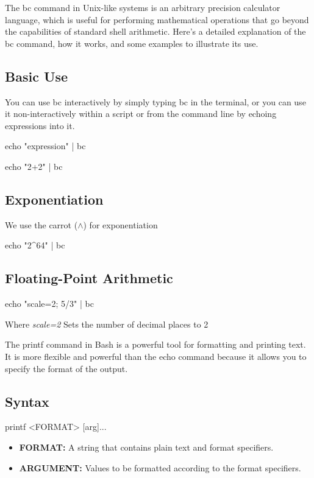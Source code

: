 \documentclass{report}
\begin{document}
    \pagebreak 
    \bigbreak \noindent 
    The bc command in Unix-like systems is an arbitrary precision calculator language, which is useful for performing mathematical operations that go beyond the capabilities of standard shell arithmetic. Here's a detailed explanation of the bc command, how it works, and some examples to illustrate its use.
    \bigbreak \noindent 
    \subsection{Basic Use}
    \bigbreak \noindent 
    You can use bc interactively by simply typing bc in the terminal, or you can use it non-interactively within a script or from the command line by echoing expressions into it.
    \bigbreak \noindent 
    \begin{bashcode}
    echo "expression" | bc

    echo "2+2" | bc
    \end{bashcode}
    \bigbreak \noindent 
    \subsection{Exponentiation}
    \bigbreak \noindent 
    We use the carrot ($\land$) for exponentiation
    \bigbreak \noindent 
    \begin{bashcode}
        echo "2^64" | bc
    \end{bashcode}

    \bigbreak \noindent 
    \subsection{Floating-Point Arithmetic}
    \bigbreak \noindent 
    \begin{bashcode}
    echo "scale=2; 5/3" | bc
    \end{bashcode}
    \bigbreak \noindent 
    Where \textit{scale=2} Sets the number of decimal places to 2

    \pagebreak 
    \bigbreak \noindent 
    The printf command in Bash is a powerful tool for formatting and printing text. It is more flexible and powerful than the echo command because it allows you to specify the format of the output.
    \bigbreak \noindent 
    \subsection{Syntax}
    \bigbreak \noindent 
    \begin{bashcode}
        printf <FORMAT> [arg]...

    \end{bashcode}
    \begin{itemize}
        \item \textbf{FORMAT:} A string that contains plain text and format specifiers.
        \item \textbf{ARGUMENT:} Values to be formatted according to the format specifiers.
    \end{itemize}
\end{document}
